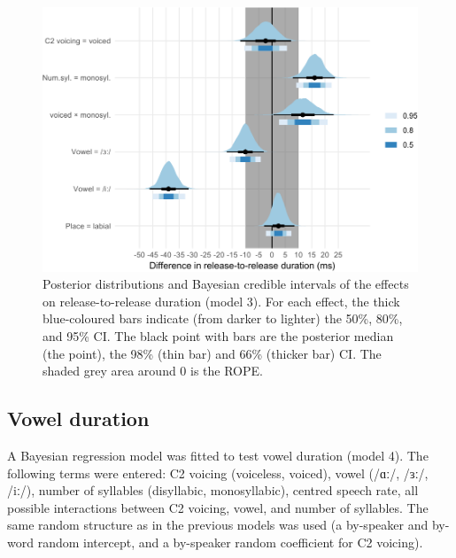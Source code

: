 \documentclass[
  12pt,
  a4paper,
]{article}
\begin{document}
\begin{figure}
\includegraphics[width=\linewidth]{2019-english-rr_files/figure-latex/rr-3-intervals-1} \caption{Posterior distributions and Bayesian credible intervals of the effects on release-to-release duration (model 3). For each effect, the thick blue-coloured bars indicate (from darker to lighter) the 50\%, 80\%, and 95\% CI. The black point with bars are the posterior median (the point), the 98\% (thin bar) and 66\% (thicker bar) CI. The shaded grey area around 0 is the ROPE.}\label{f:rr-3-intervals}
\end{figure}

\hypertarget{vowel-duration}{%
\subsection{Vowel duration}\label{vowel-duration}}

\label{s:vow}

A Bayesian regression model was fitted to test vowel duration (model 4).
The following terms were entered: C2 voicing (voiceless, voiced), vowel
(/ɑː/, /ɜː/, /iː/), number of syllables (disyllabic, monosyllabic),
centred speech rate, all possible interactions between C2 voicing,
vowel, and number of syllables. The same random structure as in the
previous models was used (a by-speaker and by-word random intercept, and
a by-speaker random coefficient for C2 voicing).
\end{document}
